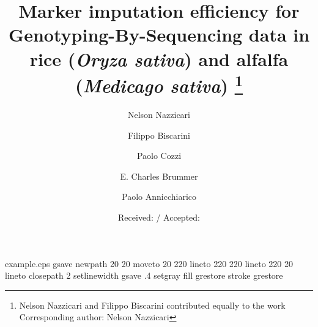 \begin{filecontents*}{example.eps}
gsave
newpath
  20 20 moveto
  20 220 lineto
  220 220 lineto
  220 20 lineto
closepath
2 setlinewidth
gsave
  .4 setgray fill
grestore
stroke
grestore
\end{filecontents*}
\RequirePackage{fix-cm}
\documentclass[smallextended]{svjour3}       \smartqed  
\usepackage{xfrac}   
\usepackage{lineno}  
\usepackage{graphicx}
\usepackage{color}
\usepackage{multirow}
\usepackage{array}
\usepackage{setspace} 
\usepackage{makecell}
\usepackage[nomarkers]{endfloat}

\newcolumntype{C}[1]{>{\centering\let\newline\\\arraybackslash\hspace{0pt}}m{#1}}

\linenumbers
\doublespacing 
{}


\title{
Marker imputation efficiency for Genotyping-By-Sequencing data in rice (\emph{Oryza sativa}) and alfalfa (\emph{Medicago sativa})
\thanks{Nelson Nazzicari and Filippo Biscarini contributed equally to the work \\
Corresponding author: Nelson Nazzicari }
}


\author{Nelson Nazzicari \and
  Filippo Biscarini  \and
  Paolo Cozzi \and
  E. Charles Brummer \and
  Paolo Annicchiarico
}



\date{Received:  / Accepted:}

\maketitle

